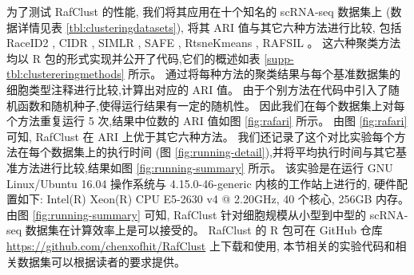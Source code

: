 
为了测试 RafClust 的性能,
我们将其应用在十个知名的 scRNA-seq 数据集上 (数据详情见表 \ref{tbl:clusteringdatasets}),
将其 ARI 值与其它六种方法进行比较,
包括 RaceID2 \cite{grun2016novo}, CIDR \cite{lin2017cidr}, SIMLR \cite{wang2018simlr}, SAFE \cite{yang2018safe}, RtsneKmeans \cite{hartigan1979algorithm,maaten2008visualizing,van2014accelerating}, RAFSIL \cite{pouyan2018random}。
这六种聚类方法均以 R 包的形式实现并公开了代码,它们的概述如表 \ref{supp-tbl:clustereringmethods} 所示。
通过将每种方法的聚类结果与每个基准数据集的细胞类型注释进行比较,计算出对应的 ARI 值。 
由于个别方法在代码中引入了随机函数和随机种子,使得运行结果有一定的随机性。
因此我们在每个数据集上对每个方法重复运行 5 次,结果中位数的 ARI 值如图 \ref{fig:rafari} 所示。
由图 \ref{fig:rafari} 可知, RafClust 在 ARI 上优于其它六种方法。
我们还记录了这个对比实验每个方法在每个数据集上的执行时间 (图 \ref{fig:running-detail}),并将平均执行时间与其它基准方法进行比较,结果如图 \ref{fig:running-summary} 所示。
该实验是在运行 GNU Linux/Ubuntu 16.04 操作系统与 4.15.0-46-generic 内核的工作站上进行的,
硬件配置如下: Intel(R) Xeon(R) CPU E5-2630 v4 @ 2.20GHz, 40 个核心, 256GB 内存。
由图 \ref{fig:running-summary} 可知, RafClust 针对细胞规模从小型到中型的 scRNA-seq 数据集在计算效率上是可以接受的。
RafClust 的 R 包可在 GitHub 仓库 \url{https://github.com/chenxofhit/RafClust} 上下载和使用,
本节相关的实验代码和相关数据集可以根据读者的要求提供。



